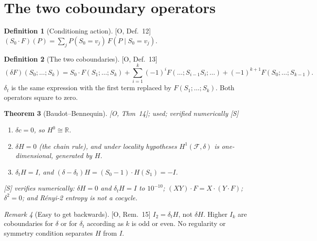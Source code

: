 \documentclass[11pt]{article}
\newtheorem{theorem}{Theorem}[section]
\theoremstyle{definition}
\newtheorem{definition}[theorem]{Definition}
\theoremstyle{remark}
\newtheorem{remark}[theorem]{Remark}
\newcommand{\R}{\mathbb{R}}
\newcommand{\src}[1]{\textsf{\small[#1]}}
\newcommand{\st}[1]{\textsf{\small\color{gray}#1}}
\begin{document}
\section{The two coboundary operators}
\begin{definition}[Conditioning action]\src{O, Def.~12} $(S_0\cdot F)(P)=\sum_jP(S_0=v_j)\,F(P\mid S_0=v_j)$.\end{definition}
\begin{definition}[The two coboundaries]\src{O, Def.~13}
\[
(\delta F)(S_0;\dots;S_k)=S_0\cdot F(S_1;\dots;S_k)+\sum_{i=1}^k(-1)^iF(\dots;S_{i-1}S_i;\dots)+(-1)^{k+1}F(S_0;\dots;S_{k-1}).
\]
$\delta_t$ is the same expression with the first term replaced by $F(S_1;\dots;S_k)$. Both operators square to zero.
\end{definition}
\begin{theorem}[Baudot--Bennequin]\label{thm:bb}
\src{O, Thm~14}; \cite{bb15} \st{used; verified numerically \src{S}}
\begin{enumerate}
  \item $\delta c=0$, so $H^0\cong\R$.
  \item $\delta H=0$ (the chain rule), and under locality hypotheses $H^1(\mathcal F,\delta)$ is one-dimensional, generated by $H$.
  \item $\delta_tH=I$, and $(\delta-\delta_t)H=(S_0-1)\cdot H(S_1)=-I$.
\end{enumerate}
\src{S} verifies numerically: $\delta H=0$ and $\delta_tH=I$ to $10^{-10}$; $(XY)\cdot F=X\cdot(Y\cdot F)$; $\delta^2=0$; and R\'enyi-2 entropy is not a cocycle.
\end{theorem}
\begin{remark}[Easy to get backwards]\src{O, Rem.~15}
$I_2=\delta_tH$, not $\delta H$. Higher $I_k$ are coboundaries for $\delta$ or for $\delta_t$ according as $k$ is odd or even. No regularity or symmetry condition separates $H$ from $I$.
\end{remark}
\end{document}
